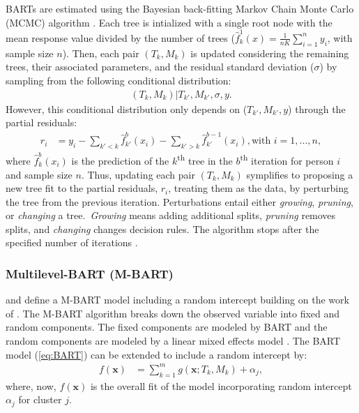\documentclass[10pt, a4paper, titlepage]{article}
\begin{document}
BARTs are estimated using the Bayesian back-fitting Markov Chain Monte Carlo (MCMC) algorithm \citep{chipman2010, hill2020, chipman2006, chipman1998,james2021}. Each tree is intialized with a single root node with the mean response value divided by the number of trees ($\hat{f}^1_k(x) = \frac{1}{nK}\sum_{i = 1}^{n}y_i$, with sample size $n$). Then, each pair $(T_k, M_k)$ is updated considering the remaining trees, their associated parameters, and the residual standard deviation ($\sigma$) by sampling from the following conditional distribution: 
\begin{align}
\label{eq:backfitting}
    (T_k, M_k)|T_{k'}, M_{k'}, \sigma, y.
\end{align} However, this conditional distribution only depends on ($T_{k'}, M_{k'}, y$) through the partial residuals:
\begin{align}
    \label{eq:partialresiduals}
    r_i &= y_i - \sum_{k' < k} \hat{f}^{b}_{k'}(x_{i}) - \sum_{k' > k} \hat{f}^{b-1}_{k'}(x_{i}), \text{with } i = 1, \dots, n,
    \end{align} where $\hat{f}^{b}_{k}(x_{i})$ is the prediction of the $k$\textsuperscript{th} tree in the $b$\textsuperscript{th} iteration for person $i$ and sample size $n$. Thus, updating each pair $(T_k, M_k)$ symplifies to proposing a new tree fit to the partial residuals, $r_{i}$, treating them as the data, by perturbing the tree from the previous iteration. Perturbations entail either \textit{growing}, \textit{pruning}, or \textit{changing} a tree.~\textit{Growing} means adding additional splits, \textit{pruning} removes splits, and \textit{changing} changes decision rules. The algorithm stops after the specified number of iterations \citep{chipman2010, hill2020, chipman2006, chipman1998, james2021}.

\subsubsection{Multilevel-BART (M-BART)}
\citet{chen2020, wagner2020} and \citet{tan2016} define a M-BART model including a random intercept building on the work of \citet{lin2019}. The M-BART algorithm breaks down the observed variable into fixed and random components. The fixed components are modeled by BART and the random components are modeled by a linear mixed effects model \citep{chen2020, wagner2020, tan2016}. The BART model (\ref{eq:BART}) can be extended to include a random intercept by:
\begin{align} 
\label{eq:M-BART}
f(\textbf{x}) &= \sum^{m}_{k=1}g(\textbf{x}; T_{k}, M_{k}) + \alpha_{j}, 
\end{align} where, now, $f(\textbf{x})$ is the overall fit of the model incorporating random intercept $\alpha_{j}$ for cluster $j$.
\end{document}
